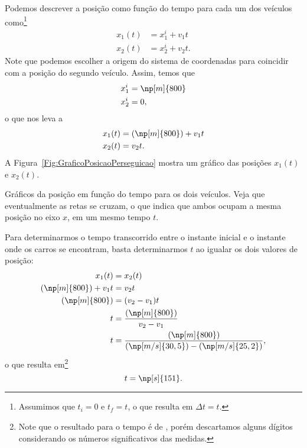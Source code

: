 Podemos descrever a posição como função do tempo para cada um dos veículos como\footnote{Assumimos que $t_i = 0$ e $t_f = t$, o que resulta em $\Delta t = t$.}
\begin{align}
	x_1(t) &= x_1^i + v_1 t \\
	x_2(t) &= x_2^i + v_2 t.
\end{align}
%
Note que podemos escolher a origem do sistema de coordenadas para coincidir com a posição do segundo veículo. Assim, temos que
\begin{align}
	x_1^i &= \np[m]{800} \\
	x_2^i &= 0,
\end{align}
%
o que nos leva a
\begin{align}
	x_1(t) &= (\np[m]{800}) + v_1 t \\
	x_2(t) &= v_2 t.
\end{align}
%
A Figura~\ref{Fig:GraficoPosicaoPerseguicao} mostra um gráfico das posições $x_1(t)$ e $x_2(t)$.

\begin{marginfigure}[-2cm]
\centering
{}
\caption{Gráficos da posição em função do tempo para os dois veículos. Veja que eventualmente as retas se cruzam, o que indica que ambos ocupam a mesma posição no eixo $x$, em um mesmo tempo $t$.\label{Fig:GraficoPosicaoPerseguicao}}
\end{marginfigure}

Para determinarmos o tempo transcorrido entre o instante inicial e o instante onde os carros se encontram, basta determinarmos $t$ ao igualar os dois valores de posição:
\begin{align}
	x_1(t) &= x_2(t) \\
	(\np[m]{800}) + v_1 t &= v_2 t \\
	(\np[m]{800}) &= (v_2 - v_1) t \\
	t &= \frac{(\np[m]{800})}{v_2-v_1} \\
	t &= \frac{(\np[m]{800})}{(\np[m/s]{30,5})-(\np[m/s]{25,2})},
\end{align}
%
o que resulta em\footnote{Note que o resultado para o tempo é de , porém descartamos alguns dígitos considerando os números significativos das medidas.}
\begin{equation}
	t = \np[s]{151}.
\end{equation}

